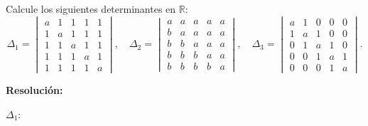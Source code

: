 \documentclass[a4paper,12pt]{article}
\begin{document}
\begin{ejercicio}[title=Ejercicio 40]
Calcule los siguientes determinantes en $\mathbb{R}$:
\[
\Delta_1 =
\begin{vmatrix}
a & 1 & 1 & 1 & 1\\
1 & a & 1 & 1 & 1\\
1 & 1 & a & 1 & 1\\
1 & 1 & 1 & a & 1\\
1 & 1 & 1 & 1 & a
\end{vmatrix}, \quad
\Delta_2 =
\begin{vmatrix}
a & a & a & a & a\\
b & a & a & a & a\\
b & b & a & a & a\\
b & b & b & a & a\\
b & b & b & b & a
\end{vmatrix}, \quad
\Delta_3 =
\begin{vmatrix}
a & 1 & 0 & 0 & 0\\
1 & a & 1 & 0 & 0\\
0 & 1 & a & 1 & 0\\
0 & 0 & 1 & a & 1\\
0 & 0 & 0 & 1 & a
\end{vmatrix}.
\]

\tcblower
\textbf{Resolución:}

\vspace{0.5em}

$\Delta_1$:

\vspace{0.5em}


\end{ejercicio}
\end{document}
